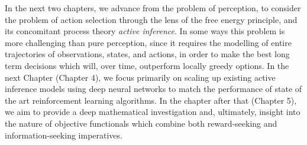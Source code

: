 In the next two chapters, we advance from the problem of perception, to consider the problem of action selection through the lens of the free energy principle, and its concomitant process theory \emph{active inference}. In some ways this problem is more challenging than pure perception, since it requires the modelling of entire trajectories of observations, states, and actions, in order to make the best long term decisions which will, over time, outperform locally greedy options. In the next Chapter (Chapter 4), we focus primarily on scaling up existing active inference models using deep neural networks to match the performance of state of the art reinforcement learning algorithms. In the chapter after that (Chapter 5), we aim to provide a deep mathematical investigation and, ultimately, insight into the nature of objective functionals which combine both reward-seeking and information-seeking imperatives.